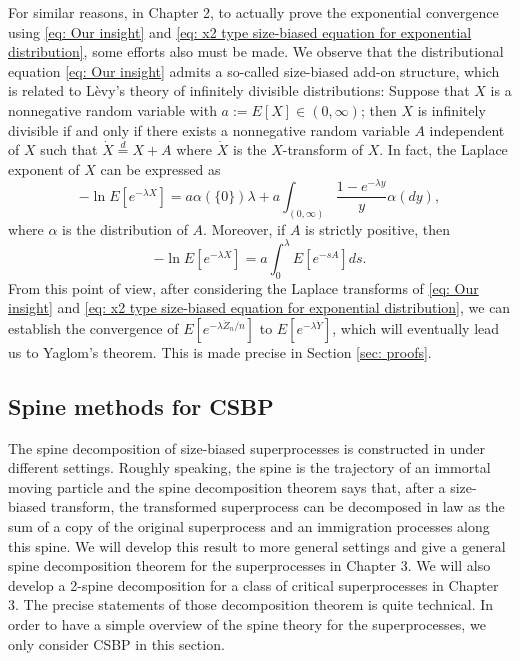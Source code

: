 \documentclass[UTF8]{pkuthss}
\theoremstyle{plain}
\theoremstyle{definition}
\numberwithin{equation}{section}
\begin{document}
For similar reasons, in Chapter 2,
to actually prove the exponential convergence using \eqref{eq: Our insight} and \eqref{eq: x2 type size-biased equation for exponential distribution}, some efforts also must be made.
We observe that the distributional equation \eqref{eq: Our insight} admits
a so-called size-biased add-on structure, which is related to L\`evy's
theory of infinitely divisible distributions: Suppose that $X$ is a nonnegative random variable with
$ a := E [X]\in (0,\infty)$; then
$X$ is infinitely divisible if and only if there exists a nonnegative random variable $A$ independent of $X$ such that $\dot X 	\overset{d} = X + A$ where $\dot X$ is the $X$-transform of $X$.
In fact,
the Laplace exponent of $X$ can be expressed as
\[
-\ln E[ e^{-\lambda X}]
=  a \alpha(\{0\}) \lambda+ a \int_{(0,\infty)} \frac{1 - e^{-\lambda y}}{y} \alpha(dy),
\]
where $\alpha$ is the distribution of $A$.
Moreover, if $A$ is strictly positive, then
\[
-\ln E[ e^{-\lambda X}]
=  a  \int_0^\lambda E [e^{-s A}] ds.
\]
From this point of view, after considering the Laplace transforms of
\eqref{eq: Our insight} and \eqref{eq: x2 type size-biased equation for exponential distribution}, we can establish the convergence of $E[e^{-\lambda \dot Z_n/n}]$ to $E[e^{-\lambda \dot {Y}}]$, which will eventually lead us to Yaglom's theorem.
This is made precise in Section \ref{sec: proofs}. 

\subsection{Spine methods for CSBP}

The spine decomposition of size-biased superprocesses is constructed in \cite{EckhoffKyprianouWinkel2015Spines, EnglanderKyprianou2004Local, LiuRenSong2009LlogL} under different settings. Roughly speaking, the spine is the trajectory of an immortal moving particle and the spine decomposition theorem says that, after a size-biased transform, the transformed superprocess can be decomposed in law as the sum of a copy of the original superprocess and an immigration processes along this spine. 
We will develop this result to more general settings and give a general spine decomposition theorem for the superprocesses in Chapter 3. We will also develop a 2-spine decomposition for a class of critical superprocesses in Chapter 3. The precise statements of those decomposition theorem is quite technical. In order to have a simple overview of the spine theory for the superprocesses, we only consider CSBP in this section.
	
\end{document}
